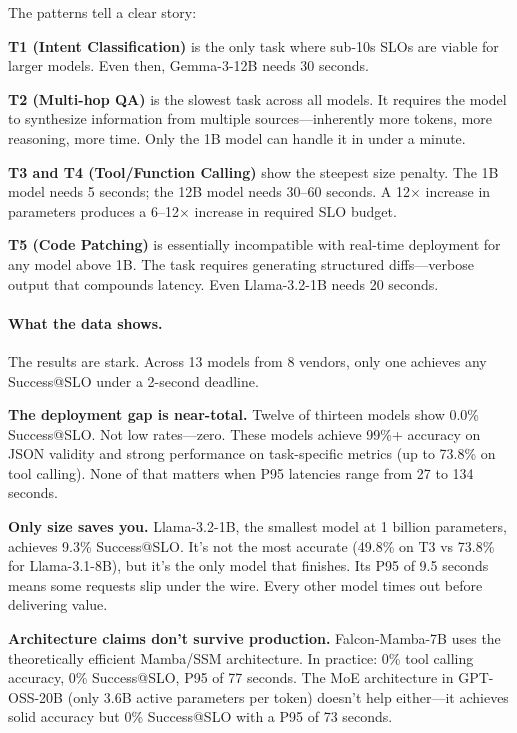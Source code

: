 \documentclass[11pt]{article}
\begin{document}
The patterns tell a clear story:

\textbf{T1 (Intent Classification)} is the only task where sub-10s SLOs are viable for larger models. Even then, Gemma-3-12B needs 30 seconds.

\textbf{T2 (Multi-hop QA)} is the slowest task across all models. It requires the model to synthesize information from multiple sources---inherently more tokens, more reasoning, more time. Only the 1B model can handle it in under a minute.

\textbf{T3 and T4 (Tool/Function Calling)} show the steepest size penalty. The 1B model needs 5 seconds; the 12B model needs 30--60 seconds. A 12$\times$ increase in parameters produces a 6--12$\times$ increase in required SLO budget.

\textbf{T5 (Code Patching)} is essentially incompatible with real-time deployment for any model above 1B. The task requires generating structured diffs---verbose output that compounds latency. Even Llama-3.2-1B needs 20 seconds.

\paragraph{What the data shows.}

The results are stark. Across 13 models from 8 vendors, only one achieves any Success@SLO under a 2-second deadline.

\textbf{The deployment gap is near-total.} Twelve of thirteen models show 0.0\% Success@SLO. Not low rates---zero. These models achieve 99\%+ accuracy on JSON validity and strong performance on task-specific metrics (up to 73.8\% on tool calling). None of that matters when P95 latencies range from 27 to 134 seconds.

\textbf{Only size saves you.} Llama-3.2-1B, the smallest model at 1 billion parameters, achieves 9.3\% Success@SLO. It's not the most accurate (49.8\% on T3 vs 73.8\% for Llama-3.1-8B), but it's the only model that finishes. Its P95 of 9.5 seconds means some requests slip under the wire. Every other model times out before delivering value.

\textbf{Architecture claims don't survive production.} Falcon-Mamba-7B uses the theoretically efficient Mamba/SSM architecture. In practice: 0\% tool calling accuracy, 0\% Success@SLO, P95 of 77 seconds. The MoE architecture in GPT-OSS-20B (only 3.6B active parameters per token) doesn't help either---it achieves solid accuracy but 0\% Success@SLO with a P95 of 73 seconds.
\end{document}
